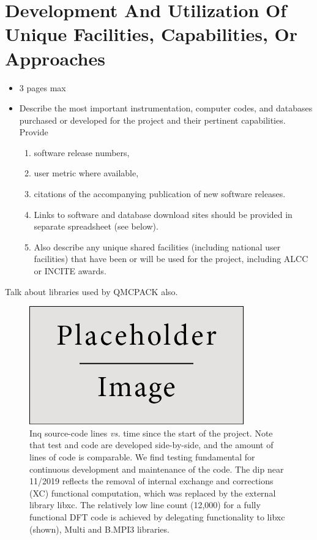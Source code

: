 \section{Development And Utilization Of Unique Facilities, Capabilities, Or Approaches}
\label{sec:development}
{\small\color{red}
\begin{itemize}
\item 3 pages max
    \item Describe the most important instrumentation, computer codes, and databases purchased or developed for the project and their pertinent capabilities. Provide 
    \begin{enumerate}
        \item software release numbers,
        \item user metric where available,
        \item citations of the accompanying publication of new software releases.
        \item Links to software and database download sites should be provided in separate spreadsheet (see below).
        \item Also describe any unique shared facilities (including national user facilities) that have been or will be used for the project, including ALCC or INCITE awards.
    \end{enumerate}    
\end{itemize}

}

Talk about libraries used by QMCPACK also.

\begin{figure}
    \centering
    \includegraphics{figures/placeholder.jpg}%
    \caption{
        Inq source-code lines \emph{vs.} time since the start of the project.  
        Note that test and code are developed side-by-side, and the amount of lines of code is comparable.  We     find testing fundamental for continuous development and maintenance of the code. 
        The dip near 11/2019 reflects the removal of internal exchange and corrections (XC) functional computation, which was replaced by the external library libxc. 
        The relatively low line count (12,000) for a fully functional DFT code is achieved by delegating functionality to libxc (shown), Multi and B.MPI3 libraries.}
    \label{fig:lines_overlay}
\end{figure}

\clearpage